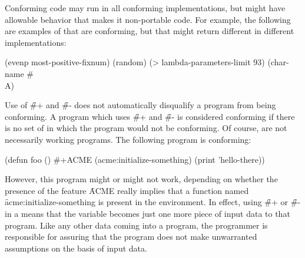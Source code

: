  
Conforming code may run in all conforming implementations, but might
have allowable  behavior that makes it
non-portable code.
For example, the following are examples of  that are conforming, but
that might return different  in different implementations:

\code
 (evenp most-positive-fixnum) \EV {}
 (random) \EV {}
 (> lambda-parameters-limit 93) \EV {}
 (char-name #\\A) \EV {}
\endcode 



Use of \f{\#+} and \f{\#-} does not automatically disqualify a program
from being conforming.  A program which uses \f{\#+} and \f{\#-} is 
considered conforming if there is no set of  in which the
program would not be conforming.  Of course,  are
not necessarily working programs.  The following program is conforming:

\code
(defun foo ()
  \#+ACME (acme:initialize-something)
  (print 'hello-there))
\endcode

However, this program might or might not work, depending on whether the
presence of the feature \f{ACME} really implies that a function named
\f{acme:initialize-something} is present in the environment.  In effect,
using \f{\#+} or \f{\#-} in a  means that the variable
becomes just one more piece of input data to that 
program.  Like any other data coming into a program, the programmer
is responsible for assuring that the program does not make unwarranted
assumptions on the basis of input data.

\endsubsubsubsection%

\endsubsubsection%

\endsubSection%
